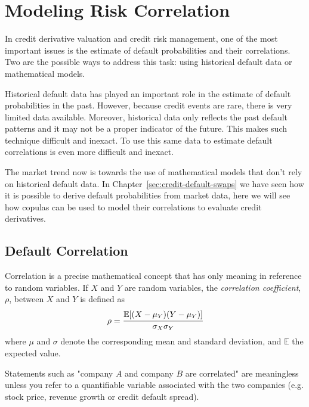 \chapter{Modeling Risk Correlation}

In credit derivative valuation and credit risk management, one of the most important issues is the estimate of default probabilities and their correlations. Two are the possible ways to address this task: using historical default data or mathematical models.

Historical default data has played an important role in the estimate of default probabilities in the past. However, because credit events are rare, there is very limited data available. Moreover, historical data only reflects the past default patterns and it may not be a proper indicator of the future. This makes such technique difficult and inexact. To use this same data to estimate default correlations is even more difficult and inexact.

The market trend now is towards the use of mathematical models that don't rely on historical default data. In Chapter~\ref{sec:credit-default-swaps} we have seen how it is possible to derive default probabilities from market data, here we will see how copulas can be used to model their correlations to evaluate credit derivatives. 

\section{Default Correlation}
\label{sec:default_correlation}
Correlation is a precise mathematical concept that has only meaning in reference to random variables. If $X$ and $Y$ are random variables, the \emph{correlation coefficient}, $\rho$, between $X$ and $Y$ is defined as
\begin{equation}
\rho = \cfrac{\mathbb{E}[(X-\mu_Y)(Y-\mu_Y)]}{\sigma_X \sigma_Y}
\label{eq:correlation_coefficient}
\end{equation}
where $\mu$ and $\sigma$ denote the corresponding mean and standard deviation, and $\mathbb{E}$ the expected value.

Statements such as "company $A$ and company $B$ are correlated" are meaningless unless you refer to a quantifiable variable associated with the two companies (e.g. stock price, revenue growth or credit default spread).

